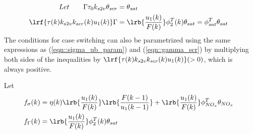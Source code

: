 \begin{align}
        Let \qquad  \Gamma \tau_0 k_{s2v} \theta_{scr} &= \theta_{sat}\\
        \lrf{\tau(k) k_{s2v} k_{scr}(k) u_1(k)} \Gamma  &=
        \lrb{\frac{u_1(k)}{F(k)}} \phi_2^T(k)  \theta_{sat} = \phi^T_{sat} \theta_{sat}
        \label{eqn::gamma_scr}
\end{align}
The conditions for case switching can also be parametrized using the same expressions as (\ref{eqn::sigma_ub_param}) and (\ref{eqn::gamma_scr}) by multiplying both sides of the inequalities by $\lrf{\tau(k) k_{s2v} k_{scr}(k) u_1(k)} (>0)$, which is always positive.

Let
\begin{align}
        f_{\sigma}(k) &= \eta(k) \lrb{\frac{u_1(k)}{F(k)}} \lrb{\frac{F(k-1)}{u_1(k-1)}}
        +\lrb{\frac{u_1(k)}{F(k)}} \phi_{NO_x}^T \theta_{NO_x}\\
        f_{\Gamma}(k) &= \lrb{\frac{u_1(k)}{F(k)}} \phi_2^T(k)  \theta_{sat}
\end{align}

